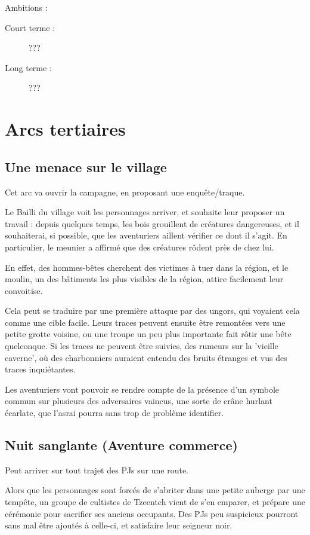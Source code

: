 \documentclass[10pt,a4paper]{book}
\begin{document}
Ambitions :
\begin{description}
\item[Court terme :]???
\item[Long terme :]???
\end{description}
\section{Arcs tertiaires}
\subsection{Une menace sur le village}
Cet arc va ouvrir la campagne, en proposant une enquête/traque.

Le Bailli du village voit les personnages arriver, et souhaite leur proposer un travail : depuis quelques temps, les bois grouillent de créatures dangereuses, et il souhaiterai, si possible, que les aventuriers aillent vérifier ce dont il s'agit. En particulier, le meunier a affirmé que des créatures rôdent près de chez lui.

En effet, des hommes-bêtes cherchent des victimes à tuer dans la région, et le moulin, un des bâtiments les plus visibles de la région, attire facilement leur convoitise.

Cela peut se traduire par une première attaque par des ungors, qui voyaient cela comme une cible facile. Leurs traces peuvent ensuite être remontées vers une petite grotte voisine, ou une troupe un peu plus importante fait rôtir une bête quelconque. Si les traces ne peuvent être suivies, des rumeurs sur la 'vieille caverne', où des charbonniers auraient entendu des bruits étranges et vus des traces inquiétantes.

Les aventuriers vont pouvoir se rendre compte de la présence d'un symbole commun sur plusieurs des adversaires vaincus, une sorte de crâne hurlant écarlate, que l'asrai pourra sans trop de problème identifier.
\subsection{Nuit sanglante (Aventure commerce)}
Peut arriver sur tout trajet des PJs sur une route.

Alors que les personnages sont forcés de s'abriter dans une petite auberge par une tempête, un groupe de cultistes de Tzeentch vient de s'en emparer, et prépare une cérémonie pour sacrifier ses anciens occupants. Des PJs peu suspicieux pourront sans mal être ajoutés à celle-ci, et satisfaire leur seigneur noir.
\end{document}
